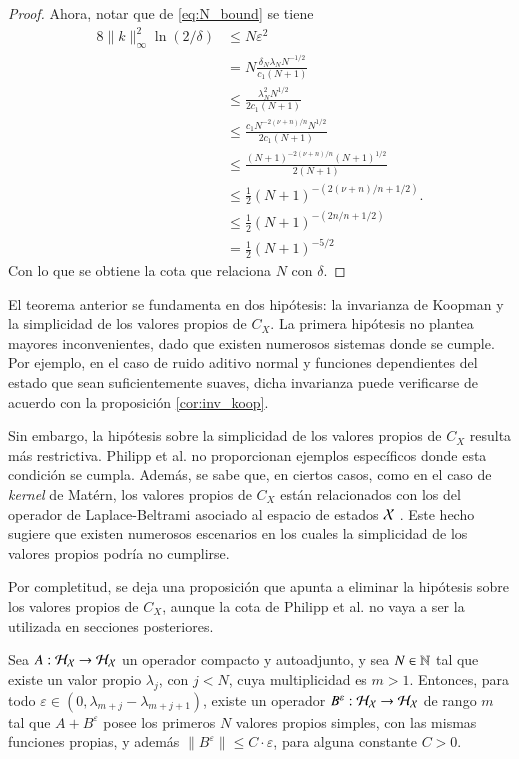 \begin{proof}
    Ahora, notar que de \ref{eq:N_bound} se tiene
    \begingroup
    \allowdisplaybreaks
    \begin{align*}
        8\|k\|^2_\infty \ln(2/\delta) & \leq N \varepsilon^2 \\
        & = N \frac{\delta_N \lambda_N N^{-1/2}}{c_1 (N+1)} \\
        & \leq \frac{\lambda_N^2 N^{1/2}}{2c_1 (N+1)} \\
        & \leq \frac{c_1 N^{-2(\nu+n)/n} N^{1/2}}{2c_1 (N+1)} \\
        & \leq \frac{ (N+1)^{-2(\nu+n)/n} (N+1)^{1/2}}{2 (N+1)} \\
        & \leq \frac{1}{2} (N+1)^{-(2(\nu+n)/n + 1/2)}. \\
        & \leq \frac{1}{2} (N+1)^{-(2n/n + 1/2)} \\
        & = \frac{1}{2} (N+1)^{-5/2}
    \end{align*}
    \endgroup
    Con lo que se obtiene la cota que relaciona $N$ con $\delta$.
\end{proof}

El teorema anterior se fundamenta en dos hipótesis: la invarianza de Koopman y la simplicidad de los valores propios de \( C_X \). La primera hipótesis no plantea mayores inconvenientes, dado que existen numerosos sistemas donde se cumple. Por ejemplo, en el caso de ruido aditivo normal y funciones dependientes del estado que sean suficientemente suaves, dicha invarianza puede verificarse de acuerdo con la proposición \ref{cor:inv_koop}.

Sin embargo, la hipótesis sobre la simplicidad de los valores propios de \( C_X \) resulta más restrictiva. Philipp et al. no proporcionan ejemplos específicos donde esta condición se cumpla. Además, se sabe que, en ciertos casos, como en el caso de \textit{kernel} de Matérn, los valores propios de \( C_X \) están relacionados con los del operador de Laplace-Beltrami asociado al espacio de estados \( \mathcal{X} \) \cite{Whittle1963StochasticDimensions, Borovitskiy2020MaternManifolds}. Este hecho sugiere que existen numerosos escenarios en los cuales la simplicidad de los valores propios podría no cumplirse.

Por completitud, se deja una proposición que apunta a eliminar la hipótesis sobre los valores propios de $C_X$, aunque la cota de Philipp et al. no vaya a ser la utilizada en secciones posteriores.

\begin{prop}
    Sea $A: \mathcal{H}_{\mathcal{X}} \to \mathcal{H}_{\mathcal{X}}$ un operador compacto y autoadjunto, y sea $N \in \mathbb{N}$ tal que existe un valor propio $\lambda_j$, con $j < N$, cuya multiplicidad es $m > 1$. Entonces, para todo $\varepsilon \in (0, \lambda_{m+j} - \lambda_{m+j+1})$, existe un operador $B^\varepsilon: \mathcal{H}_{\mathcal{X}} \to \mathcal{H}_{\mathcal{X}}$ de rango $m$ tal que $A + B^\varepsilon$ posee los primeros $N$ valores propios simples, con las mismas funciones propias, y además $\| B^\varepsilon \| \leq C \cdot \varepsilon$, para alguna constante $C > 0$.
    \label{prop:val_prop_sim}
\end{prop}

